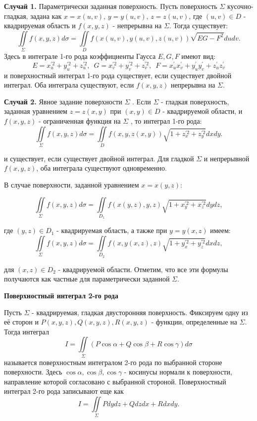 \textbf{Случай 1.} Параметрически заданная поверхность. Пусть поверхность $\Sigma$
кусочно-гладкая, задана как $x=x(u,v),\, y=y(u,v),\, z=z(u,v)$, где $(u,v) \in D$ - квадрируемая область и $f(x,y,z)$ - непрерывна на $\Sigma$. Тогда существует:
$$\iint\limits_\Sigma f(x,y,z) d\sigma = \iint\limits_D f(x(u,v), y(u,v), z(u,v)) \sqrt{EG-F^2} dudv.$$
Здесь в интеграле 1-го рода коэффициенты Гаусса $E,G,F$ имеют вид:
$$ E=x_u^{'2}+y_u^{'2}+z_u^{'2}, \,\,\, G=x_v^{'2}+y_v^{'2}+z_v^{'2}, \,\,\, F=x_u^{'}x_v^{'}+y_u^{'}y_v^{'}+z_u^{'}z_v^{'}$$
и поверхностный интеграл 1-го рода существует, если существует двойной интеграл. Оба интеграла существуют, если $f(x,y,z)$ непрерывна на $\Sigma$.

\par\bigskip

\textbf{Случай 2.} Явное задание поверхности $\Sigma$ . Если $\Sigma$ - гладкая поверхность, заданная уравнением $z=z(x,y)$ при $(x,y) \in D$ - квадрируемой области, и $f(x,y,z)$ - ограниченная функция на $\Sigma$ , то интеграл 1-го рода:
$$\iint\limits_\Sigma f(x,y,z) d\sigma = \iint\limits_D f(x,y, z(x,y)) \sqrt{1+z_x^{'2}+z_y^{'2}} dxdy.$$

и существует, если существует двойной интеграл. Для гладкой $\Sigma$ и непрерывной $f(x,y,z)$, оба интеграла существуют одновременно.


В случае поверхности, заданной уравнением $x=x(y,z)$:

$$\iint\limits_\Sigma f(x,y,z) d\sigma = \iint\limits_{D_1} f(x(y,z),y,z) \sqrt{1+x_y^{'2}+x_z^{'2}} dydz,$$

где $(y,z) \in D_1$ - квадрируемая область, а также при $y=y(x,z)$ имеем:
$$\iint\limits_\Sigma f(x,y,z) d\sigma = \iint\limits_{D_2} f(x,y(x,z),z) \sqrt{1+y_x^{'2}+y_z^{'2}} dxdz,$$

для $(x,z) \in D_2$ - квадрируемой области. Отметим, что все эти формулы получаются как частные для параметрически заданной $\Sigma$.

\begin{center}
	\textbf{Поверхностный интеграл 2-го рода}
\end{center}

 Пусть $\Sigma$ - квадрируемая, гладкая двусторонняя поверхность. Фиксируем
одну из её сторон и $P(x,y,z), Q(x,y,z), R(x,y,z)$ - функции, определенные
на $\Sigma$. Тогда интеграл 
$$I=\iint\limits_\Sigma(P\cos\alpha + Q\cos\beta + R\cos\gamma) d\sigma$$
 называется поверхностным интегралом 2-го рода по выбранной стороне поверхности. Здесь
$\cos\alpha, \cos\beta, \cos\gamma$ - косинусы нормали к поверхности, направление которой
согласовано с выбранной стороной. Поверхностный интеграл 2-го рода записывают еще как 
$$I=\iint\limits_\Sigma Pdydz+Qdzdx+Rdxdy.$$ 

